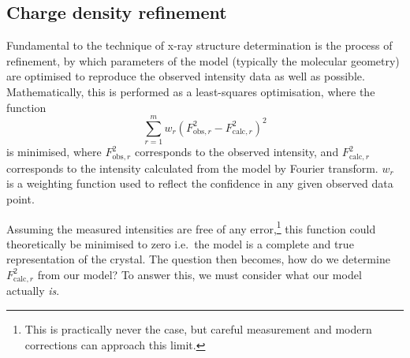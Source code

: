 \begin{refsection}
\subsection{Charge density refinement}\label{sec:cd}
Fundamental to the technique of x-ray structure determination is the process of refinement, by which parameters of the model (typically the molecular geometry) are optimised to reproduce the observed intensity data as well as possible.
Mathematically, this is performed as a least-squares optimisation, where the function
\begin{equation}
    \sum^{m}_{r=1} w_{r} {\left(F^2_{\mathrm{obs}, r} - F^2_{\mathrm{calc}, r} \right)} ^{2}
\end{equation}
is minimised, where $ F^2_{\mathrm{obs}, r} $ corresponds to the observed intensity, and $ F^2_{\mathrm{calc}, r} $ corresponds to the intensity calculated from the model by Fourier transform.
$ w_{r} $ is a weighting function used to reflect the confidence in any given observed data point.

Assuming the measured intensities are free of any error,\footnote{This is practically never the case, but careful measurement and modern corrections can approach this limit.} this function could theoretically be minimised to zero i.e.\ the model is a complete and true representation of the crystal.
The question then becomes, how do we determine $ F^2_{\mathrm{calc}, r} $ from our model?
To answer this, we must consider what our model actually \emph{is}.


\end{refsection}

